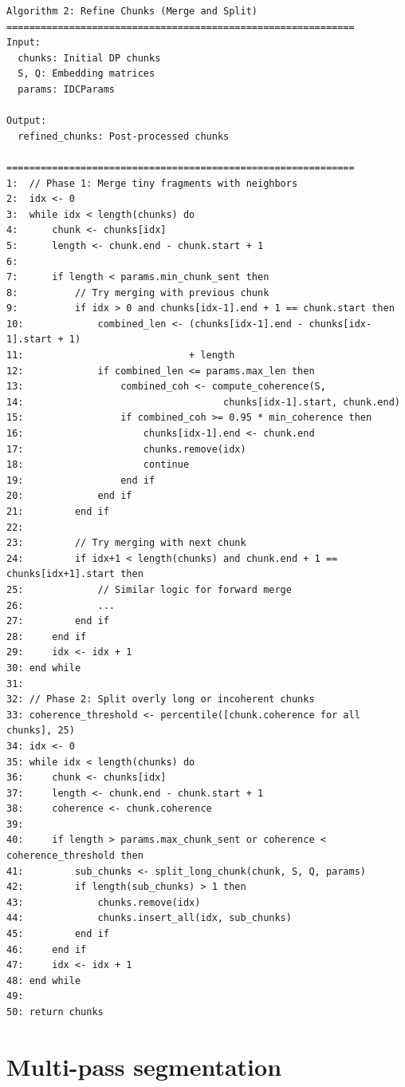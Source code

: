 \documentclass[12pt,a4paper]{report}
\begin{document}
\begin{verbatim}
Algorithm 2: Refine Chunks (Merge and Split)
=============================================================
Input:
  chunks: Initial DP chunks
  S, Q: Embedding matrices
  params: IDCParams
  
Output:
  refined_chunks: Post-processed chunks

=============================================================
1:  // Phase 1: Merge tiny fragments with neighbors
2:  idx <- 0
3:  while idx < length(chunks) do
4:      chunk <- chunks[idx]
5:      length <- chunk.end - chunk.start + 1
6:      
7:      if length < params.min_chunk_sent then
8:          // Try merging with previous chunk
9:          if idx > 0 and chunks[idx-1].end + 1 == chunk.start then
10:             combined_len <- (chunks[idx-1].end - chunks[idx-1].start + 1)
11:                             + length
12:             if combined_len <= params.max_len then
13:                 combined_coh <- compute_coherence(S, 
14:                                   chunks[idx-1].start, chunk.end)
15:                 if combined_coh >= 0.95 * min_coherence then
16:                     chunks[idx-1].end <- chunk.end
17:                     chunks.remove(idx)
18:                     continue
19:                 end if
20:             end if
21:         end if
22:         
23:         // Try merging with next chunk
24:         if idx+1 < length(chunks) and chunk.end + 1 == chunks[idx+1].start then
25:             // Similar logic for forward merge
26:             ...
27:         end if
28:     end if
29:     idx <- idx + 1
30: end while
31:
32: // Phase 2: Split overly long or incoherent chunks
33: coherence_threshold <- percentile([chunk.coherence for all chunks], 25)
34: idx <- 0
35: while idx < length(chunks) do
36:     chunk <- chunks[idx]
37:     length <- chunk.end - chunk.start + 1
38:     coherence <- chunk.coherence
39:     
40:     if length > params.max_chunk_sent or coherence < coherence_threshold then
41:         sub_chunks <- split_long_chunk(chunk, S, Q, params)
42:         if length(sub_chunks) > 1 then
43:             chunks.remove(idx)
44:             chunks.insert_all(idx, sub_chunks)
45:         end if
46:     end if
47:     idx <- idx + 1
48: end while
49:
50: return chunks
\end{verbatim}

\section{Multi-pass segmentation}
\end{document}
